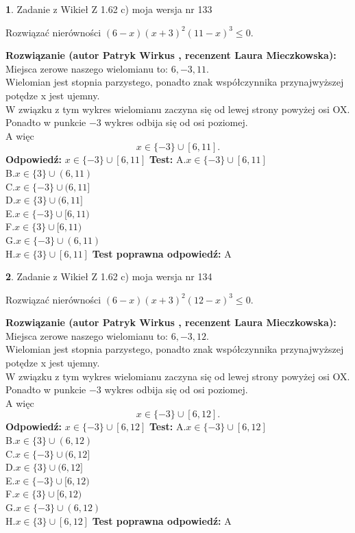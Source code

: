 \documentclass[12pt, a4paper]{article}
\theoremstyle{definition} %
\newtheorem{zad}{}
\newcommand{\zadStart}[1]{\begin{zad}#1\newline}
\newcommand{\zadStop}{\end{zad}}
\newcommand{\rozwStart}[2]{\noindent \textbf{Rozwiązanie (autor #1 , recenzent #2): }\newline}
\newcommand{\rozwStop}{\newline}
\newcommand{\odpStart}{\noindent \textbf{Odpowiedź:}\newline}
\newcommand{\odpStop}{\newline}
\newcommand{\testStart}{\noindent \textbf{Test:}\newline}
\newcommand{\testStop}{\newline}
\newcommand{\kluczStart}{\noindent \textbf{Test poprawna odpowiedź:}\newline}
\newcommand{\kluczStop}{\newline}
\begin{document}
\zadStart{Zadanie z Wikieł Z 1.62 c) moja wersja nr 133}

Rozwiązać nierówności $(6-x)(x+3)^{2}(11-x)^{3}\le0$.
\zadStop
\rozwStart{Patryk Wirkus}{Laura Mieczkowska}
Miejsca zerowe naszego wielomianu to: $6, -3, 11$.\\
Wielomian jest stopnia parzystego, ponadto znak współczynnika przy\linebreak najwyższej potędze x jest ujemny.\\ W związku z tym wykres wielomianu zaczyna się od lewej strony powyżej osi OX.\\
Ponadto w punkcie $-3$ wykres odbija się od osi poziomej.\\
A więc $$x \in \{-3\} \cup [6,11].$$
\rozwStop
\odpStart
$x \in \{-3\} \cup [6,11]$
\odpStop
\testStart
A.$x \in \{-3\} \cup [6,11]$\\
B.$x \in \{3\} \cup (6,11)$\\
C.$x \in \{-3\} \cup (6,11]$\\
D.$x \in \{3\} \cup (6,11]$\\
E.$x \in \{-3\} \cup [6,11)$\\
F.$x \in \{3\} \cup [6,11)$\\
G.$x \in \{-3\} \cup (6,11)$\\
H.$x \in \{3\} \cup [6,11]$
\testStop
\kluczStart
A
\kluczStop



\zadStart{Zadanie z Wikieł Z 1.62 c) moja wersja nr 134}

Rozwiązać nierówności $(6-x)(x+3)^{2}(12-x)^{3}\le0$.
\zadStop
\rozwStart{Patryk Wirkus}{Laura Mieczkowska}
Miejsca zerowe naszego wielomianu to: $6, -3, 12$.\\
Wielomian jest stopnia parzystego, ponadto znak współczynnika przy\linebreak najwyższej potędze x jest ujemny.\\ W związku z tym wykres wielomianu zaczyna się od lewej strony powyżej osi OX.\\
Ponadto w punkcie $-3$ wykres odbija się od osi poziomej.\\
A więc $$x \in \{-3\} \cup [6,12].$$
\rozwStop
\odpStart
$x \in \{-3\} \cup [6,12]$
\odpStop
\testStart
A.$x \in \{-3\} \cup [6,12]$\\
B.$x \in \{3\} \cup (6,12)$\\
C.$x \in \{-3\} \cup (6,12]$\\
D.$x \in \{3\} \cup (6,12]$\\
E.$x \in \{-3\} \cup [6,12)$\\
F.$x \in \{3\} \cup [6,12)$\\
G.$x \in \{-3\} \cup (6,12)$\\
H.$x \in \{3\} \cup [6,12]$
\testStop
\kluczStart
A
\kluczStop
\end{document}
